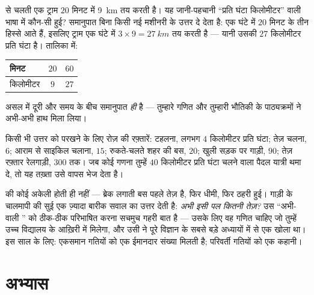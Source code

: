 \begin{example}[समानुपात से चाल]\label{ex:g6:describing-motion:proportion}
 से चलती एक ट्राम $20$ मिनट में \qty{9}{km} तय करती है। यह
जानी-पहचानी ``प्रति घंटा किलोमीटर'' वाली भाषा में कौन-सी  हुई?
समानुपात बिना किसी नई मशीनरी के उत्तर दे देता है: एक घंटे में $20$
मिनट के तीन हिस्से आते हैं, इसलिए ट्राम एक घंटे में
$3 \times 9 = \qty{27}{km}$ तय करती है --- यानी उसकी  $27$
किलोमीटर प्रति घंटा है। तालिका में:
\begin{center}
\begin{tabular}{l|cc}
मिनट & $20$ & $60$ \\
\hline
किलोमीटर & $9$ & $27$
\end{tabular}
\end{center}
 असल में दूरी और समय के बीच समानुपात \emph{ही} है ---
तुम्हारे गणित और तुम्हारी भौतिकी के पाठ्यक्रमों ने अभी-अभी हाथ मिला
लिया।
\end{example}

\begin{example}[रफ़्तारों का तख़्ता]\label{ex:g6:describing-motion:paces}
किसी भी उत्तर को परखने के लिए रोज़ की रफ़्तारें: टहलना, लगभग $4$
किलोमीटर प्रति घंटा; तेज़ चलना, $6$; आराम से साइकिल चलाना, $15$;
रुकते-चलते शहर की बस, $20$; खुली सड़क पर गाड़ी, $90$; तेज़ रफ़्तार
रेलगाड़ी, $300$ तक। जब कोई गणना तुम्हें $40$ किलोमीटर प्रति घंटा चलने
वाला पैदल यात्री थमा दे, तो यह तख़्ता उसे वापस भेज देता है।
\end{example}

\begin{remark}[किसी पल की चाल]\label{rem:g6:describing-motion:instant}
 की कोई अकेली  होती ही नहीं --- ब्रेक लगाती बस पहले
तेज़ है, फिर धीमी, फिर ठहरी हुई। गाड़ी के चालमापी की सुई एक ज़्यादा
बारीक सवाल का उत्तर देती है: \emph{अभी इसी पल कितनी तेज़?} उस
``अभी-वाली '' को ठीक-ठीक परिभाषित करना सचमुच गहरी बात है --- उसके
लिए वह गणित चाहिए जो तुम्हें उच्च विद्यालय के आख़िरी  में मिलेगा,
और उसी ने पूरे विज्ञान के सबसे बड़े अध्यायों में से एक खोला था। इस साल
के लिए: एकसमान गतियों को एक ईमानदार संख्या मिलती है; परिवर्ती गतियों
को एक कहानी।
\end{remark}

\section{अभ्यास}

